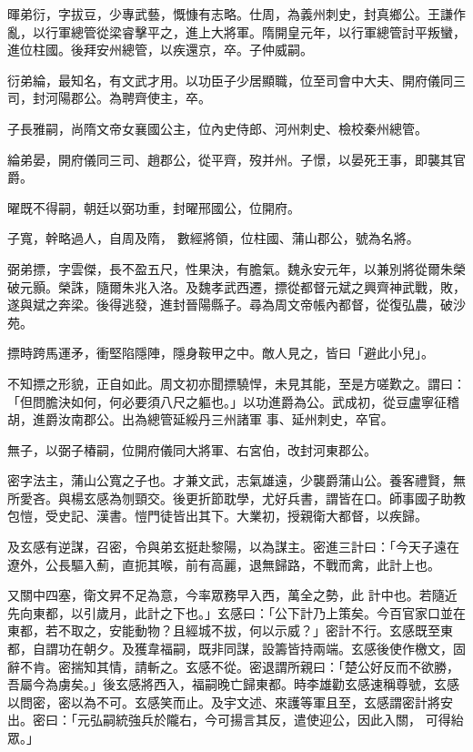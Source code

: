 \begin{pinyinscope}
 暉弟衍，字拔豆，少專武藝，慨慷有志略。仕周，為義州刺史，封真鄉公。王謙作亂，以行軍總管從梁睿擊平之，進上大將軍。隋開皇元年，以行軍總管討平叛蠻，進位柱國。後拜安州總管，以疾還京，卒。子仲威嗣。



 衍弟綸，最知名，有文武才用。以功臣子少居顯職，位至司會中大夫、開府儀同三司，封河陽郡公。為聘齊使主，卒。



 子長雅嗣，尚隋文帝女襄國公主，位內史侍郎、河州刺史、檢校秦州總管。



 綸弟晏，開府儀同三司、趙郡公，從平齊，歿并州。子憬，以晏死王事，即襲其官爵。



 曜既不得嗣，朝廷以弼功重，封曜邢國公，位開府。



 子寬，幹略過人，自周及隋，
 數經將領，位柱國、蒲山郡公，號為名將。



 弼弟摽，字雲傑，長不盈五尺，性果決，有膽氣。魏永安元年，以兼別將從爾朱榮破元顥。榮誅，隨爾朱兆入洛。及魏孝武西遷，摽從都督元斌之興齊神武戰，敗，遂與斌之奔梁。後得逃發，進封晉陽縣子。尋為周文帝帳內都督，從復弘農，破沙苑。



 摽時跨馬運矛，衝堅陷隱陣，隱身鞍甲之中。敵人見之，皆曰「避此小兒」。



 不知摽之形貌，正自如此。周文初亦聞摽驍悍，未見其能，至是方嗟歎之。謂曰：「但問膽決如何，何必要須八尺之軀也。」以功進爵為公。武成初，從豆盧寧征稽胡，進爵汝南郡公。出為總管延綏丹三州諸軍
 事、延州刺史，卒官。



 無子，以弼子椿嗣，位開府儀同大將軍、右宮伯，改封河東郡公。



 密字法主，蒲山公寬之子也。才兼文武，志氣雄遠，少襲爵蒲山公。養客禮賢，無所愛吝。與楊玄感為刎頸交。後更折節耽學，尤好兵書，謂皆在口。師事國子助教包愷，受史記、漢書。愷門徒皆出其下。大業初，授親衛大都督，以疾歸。



 及玄感有逆謀，召密，令與弟玄挺赴黎陽，以為謀主。密進三計曰：「今天子遠在遼外，公長驅入薊，直扼其喉，前有高麗，退無歸路，不戰而禽，此計上也。



 又關中四塞，衛文昇不足為意，今率眾務早入西，萬全之勢，此
 計中也。若隨近先向東都，以引歲月，此計之下也。」玄感曰：「公下計乃上策矣。今百官家口並在東都，若不取之，安能動物？且經城不拔，何以示威？」密計不行。玄感既至東都，自謂功在朝夕。及獲韋福嗣，既非同謀，設籌皆持兩端。玄感後使作檄文，固辭不肯。密揣知其情，請斬之。玄感不從。密退謂所親曰：「楚公好反而不欲勝，吾屬今為虜矣。」後玄感將西入，福嗣晚亡歸東都。時李雄勸玄感速稱尊號，玄感以問密，密以為不可。玄感笑而止。及宇文述、來護等軍且至，玄感謂密計將安出。密曰：「元弘嗣統強兵於隴右，今可揚言其反，遣使迎公，因此入關，
 可得紿眾。」




\end{pinyinscope}
